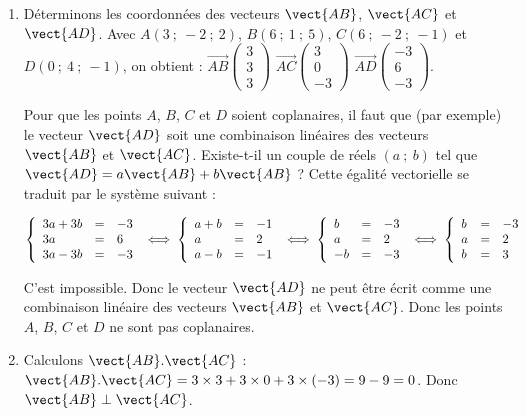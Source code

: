 \medskip

\begin{enumerate}
\item Déterminons les coordonnées des vecteurs $\vect{AB}$, $\vect{AC}$ et $\vect{AD}$. Avec $A(3~;~-2~;~2)$, $B(6~;~1~;~5)$, $C(6~;~-2~;~-1)$ et $D(0~;~4~;~-1)$, on obtient : 
	\(\overrightarrow{AB}\begin{pmatrix}3\\3\\3\end{pmatrix}\) \quad \(\overrightarrow{AC}\begin{pmatrix}3\\0\\-3\end{pmatrix}\) \quad \(\overrightarrow{AD}\begin{pmatrix}-3\\6\\-3\end{pmatrix}\).
	
Pour que les points $A$, $B$, $C$ et $D$ soient coplanaires, il faut que (par exemple) le vecteur $\vect{AD}$ soit une combinaison linéaires des vecteurs $\vect{AB}$ et $\vect{AC}$. Existe-t-il un couple de réels $(a~;~b)$ tel que $\vect{AD}=a\vect{AB}+b\vect{AB}$ ? Cette égalité vectorielle se traduit par le système suivant :
	
$\left\{\begin{array}{l c l} 3a+3b&=&-3\\3a &=& 6\\3a-3b&=&-3	\end{array}\right. \iff \left\{\begin{array}{l c l} a+b&=&-1\\a &=& 2\\a-b&=&-1	\end{array}\right.\iff \left\{\begin{array}{l c l} b&=&-3\\a &=& 2\\-b&=&-3 \end{array}\right. \iff \left\{\begin{array}{l c l} b&=&-3\\a &=& 2\\b&=&3	\end{array}\right.$
	
C'est impossible. Donc le vecteur $\vect{AD}$ ne peut être écrit comme une combinaison linéaire des vecteurs $\vect{AB}$ et $\vect{AC}$. Donc les points $A$, $B$, $C$ et $D$ ne sont pas coplanaires.
	\item Calculons $\vect{AB}.\vect{AC}$ : $\vect{AB}.\vect{AC}=3\times3+3\times 0+ 3\times (-3) = 9 - 9 = 0$. Donc $\vect{AB}\perp \vect{AC}$.
	

\end{enumerate}
